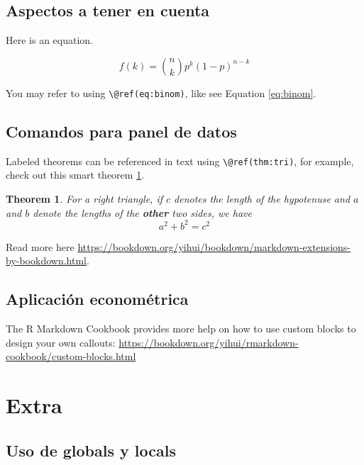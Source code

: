 \documentclass[
]{book}
\newtheorem{theorem}{Theorem}[chapter]
\theoremstyle{definition}
\theoremstyle{definition}
\theoremstyle{definition}
\theoremstyle{definition}
\theoremstyle{remark}
\begin{document}
\hypertarget{aspectos-a-tener-en-cuenta}{%
\section{Aspectos a tener en cuenta}\label{aspectos-a-tener-en-cuenta}}

Here is an equation.

\begin{equation} 
  f\left(k\right) = \binom{n}{k} p^k\left(1-p\right)^{n-k}
  \label{eq:binom}
\end{equation}

You may refer to using \texttt{\textbackslash{}@ref(eq:binom)}, like see Equation \eqref{eq:binom}.

\hypertarget{comandos-para-panel-de-datos}{%
\section{Comandos para panel de datos}\label{comandos-para-panel-de-datos}}

Labeled theorems can be referenced in text using \texttt{\textbackslash{}@ref(thm:tri)}, for example, check out this smart theorem \ref{thm:tri}.

\begin{theorem}
\protect\hypertarget{thm:tri}{}\label{thm:tri}For a right triangle, if \(c\) denotes the \emph{length} of the hypotenuse
and \(a\) and \(b\) denote the lengths of the \textbf{other} two sides, we have
\[a^2 + b^2 = c^2\]
\end{theorem}

Read more here \url{https://bookdown.org/yihui/bookdown/markdown-extensions-by-bookdown.html}.

\hypertarget{aplicaciuxf3n-economuxe9trica}{%
\section{Aplicación econométrica}\label{aplicaciuxf3n-economuxe9trica}}

The R Markdown Cookbook provides more help on how to use custom blocks to design your own callouts: \url{https://bookdown.org/yihui/rmarkdown-cookbook/custom-blocks.html}

\hypertarget{extra}{%
\chapter{Extra}\label{extra}}

\hypertarget{uso-de-globals-y-locals}{%
\section{Uso de globals y locals}\label{uso-de-globals-y-locals}}
\end{document}
